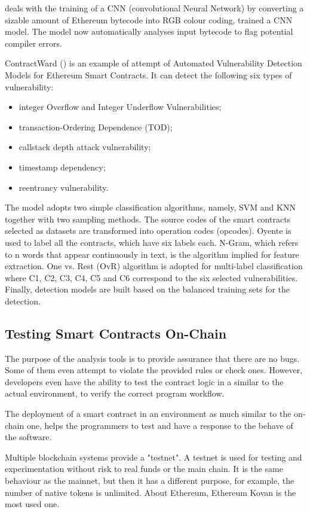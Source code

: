 \documentclass[a4paper,sigconf, language=french,
language=german, language=spanish, language=english]{acmart}
\begin{document}
\cite{CNNML} deals with the training of a CNN (convolutional Neural Network) by converting a sizable amount of Ethereum bytecode into RGB colour coding,  trained a CNN model. The model now automatically analyses input bytecode to flag potential compiler errors. 

ContractWard (\cite{MLtool}) is an example of attempt of Automated Vulnerability Detection Models for Ethereum Smart Contracts. It can detect the following six types of vulnerability: 
\begin{itemize}
    \item integer Overflow and Integer Underflow Vulnerabilities;
    \item transaction-Ordering Dependence (TOD);
    \item callstack depth attack vulnerability;
    \item timestamp dependency;
    \item reentrancy vulnerability.
\end{itemize}

The model adopts two simple classification algorithms, namely, SVM and KNN together with two sampling methods.
The source codes of the smart contracts selected as datasets are transformed into operation codes (opcodes). Oyente is used to label all the contracts, which have six labels each.  N-Gram, which refers to n words that appear
continuously in text, is the algorithm implied for feature extraction.
One vs. Rest (OvR) algorithm is adopted for multi-label classification where
C1, C2, C3, C4, C5 and C6 correspond to the six selected vulnerabilities. 
Finally, detection models are built based on the balanced
training sets for the detection.

\subsection{Testing Smart Contracts On-Chain}
The purpose of the analysis tools is to provide assurance that there are no bugs. Some of them even attempt to violate the provided rules or check ones. However, developers even have the ability to test the contract logic in a similar to the actual environment, to verify the correct program workflow.

The deployment of a smart contract in an environment as much similar to the on-chain one, helps the programmers to test and have a response to the behave of the software.

Multiple blockchain systems provide a "testnet". A testnet is used for testing and experimentation without risk to real funds or the main chain. It is the same behaviour as the mainnet, but then it has a different purpose, for example, the number of native tokens is unlimited.
About Ethereum, Ethereum Kovan is the most used one. 
\end{document}
